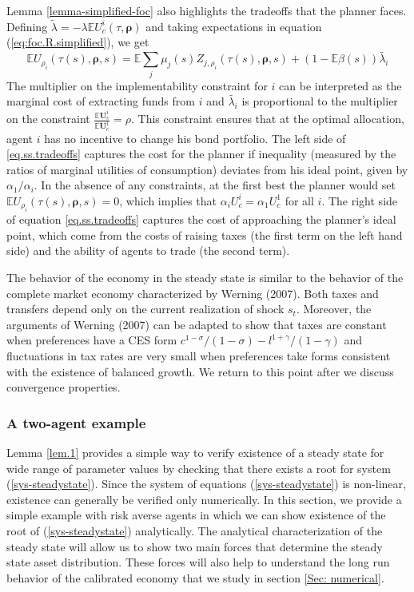 \documentclass[thmsb,11pt]{article}
\begin{document}
Lemma \ref{lemma-simplified-foc} also highlights the tradeoffs that the planner faces.  Defining $\tilde{\lambda}=-\lambda \mathbb{E} U^i_c(\tau,\bm \rho)$ and taking expectations in equation (\ref{eq:foc.R.simplified}), we get
\begin{equation}
\label{eq.ss.tradeoffs}
\mathbb{E} U_{\rho_i}(\tau(s),\bm \rho,s)= \mathbb{E} \sum_j\mu_j(s)Z_{j,\rho_i}(\tau(s),\bm \rho,s) + (1-\mathbb{E}\beta(s))\tilde{\lambda_i}
\end{equation}
The multiplier on the implementability constraint for $i$ can be interpreted as the marginal cost of extracting funds from $i$  and $\tilde{\lambda_i}$ is proportional to the multiplier on the constraint $\frac{\mathbb{E}\bm{U}^i_c}{\mathbb{E}\bm{U}^1_c}=\rho$. This constraint ensures that at the optimal allocation, agent $i$ has no  incentive to change his bond portfolio. The left side of \eqref{eq.ss.tradeoffs} captures the cost for the planner if inequality (measured by the ratios of marginal utilities of consumption) deviates from his ideal point, given by $\alpha_1/\alpha_i$. In the absence of any constraints, at the first best the planner would set $\mathbb{E} U_{\rho_i}(\tau(s),\bm \rho,s)=0$, which implies that $\alpha_i U^i_c = \alpha_1 U^1_c$ for all $i$. The right  side of equation \eqref{eq.ss.tradeoffs} captures the cost of approaching the planner's ideal point, which come from the costs of raising taxes (the first term on the left hand side) and the ability of
agents to trade (the second term).

The behavior of the economy in the steady state is similar to the behavior of the complete market economy characterized by Werning (2007). Both taxes and transfers depend only on the current realization of shock $s_t$. Moreover, the arguments of Werning (2007) can be adapted  to show that taxes are constant when preferences have a CES form $c^{1-\sigma}/(1-\sigma) - l^{1+\gamma}/(1-\gamma) $ and fluctuations in tax rates are very small when preferences take forms consistent with the existence of  balanced growth. We return to this point after we discuss convergence properties.

\subsubsection{A two-agent example}\label{sec: 2 agent example}

Lemma \ref{lem.1} provides a simple way to verify existence of a steady state for wide range of parameter values by checking that there exists a root for system (\ref{sys-steadystate}). Since the system of equations (\ref{sys-steadystate}) is non-linear, existence can generally be verified only numerically. In this section, we provide a simple example with risk averse agents in which we can show existence of the root of (\ref{sys-steadystate}) analytically. The analytical characterization of the steady state will allow us to show two main forces that determine the steady state asset distribution. These forces will also help to understand the long run behavior of the calibrated economy that we study in section \ref{Sec: numerical}.
\end{document}
